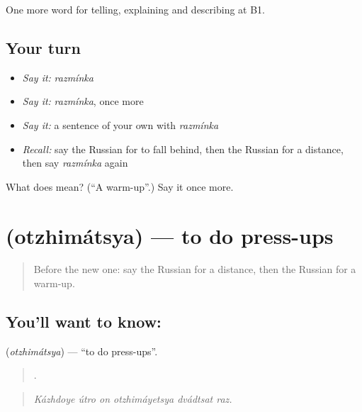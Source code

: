 \begin{grammarlens}[title={What you've built}]
One more word for telling, explaining and describing at B1.
\end{grammarlens}

\subsection*{Your turn}
\begin{itemize}
\raggedright
  \item \emph{Say it:} \emph{razmínka}
  \item \emph{Say it:} \emph{razmínka}, once more
  \item \emph{Say it:} a sentence of your own with \emph{razmínka}
  \item \emph{Recall:} say the Russian for to fall behind, then the Russian for a distance, then say \emph{razmínka} again
\end{itemize}

\begin{tcolorbox}[breakable,colback=teal!4,colframe=teal!35!black,title={Before you move on}]
What does  mean? (\textquotedblleft{}A warm-up\textquotedblright{}.) Say it once more.
\end{tcolorbox}
\section[\texorpdfstring{\ru{отжиматься} (otzhimátsya)}{отжиматься (otzhimátsya)}]{ (otzhimátsya) — to do press-ups}

\label{lesson:RU-C513-otzhimatsya}



\begin{quote}
Before the new one: say the Russian for a distance, then the Russian for a warm-up.
\end{quote}

\subsection*{You'll want to know: }
\textbf{} (\emph{otzhimátsya}) — \textquotedblleft{}to do press-ups\textquotedblright{}.

\begin{quote}
     .
\end{quote}

\begin{quote}
\emph{Kázhdoye útro on otzhimáyetsya dvádtsat raz.}
\end{quote}

